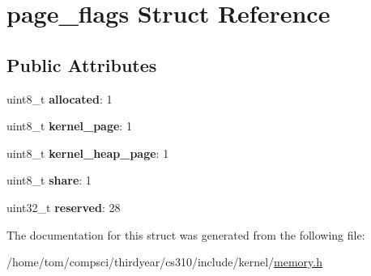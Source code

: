 \hypertarget{structpage__flags}{}\section{page\+\_\+flags Struct Reference}
\label{structpage__flags}
\subsection*{Public Attributes}
\begin{DoxyCompactItemize}
\item 
\mbox{\label{structpage__flags_ae7444465517cea45d08af9cb572ac2a4}} 
uint8\+\_\+t {\bfseries allocated}\+: 1
\item 
\mbox{\label{structpage__flags_a29918bee0403900b950c52369e589a69}} 
uint8\+\_\+t {\bfseries kernel\+\_\+page}\+: 1
\item 
\mbox{\label{structpage__flags_a458f27275121033aa8c285ee0550f99a}} 
uint8\+\_\+t {\bfseries kernel\+\_\+heap\+\_\+page}\+: 1
\item 
\mbox{\label{structpage__flags_aadee98adcf094cbf8f27eb93978c50dc}} 
uint8\+\_\+t {\bfseries share}\+: 1
\item 
\mbox{\label{structpage__flags_a9049c1089b445ffdbb67d6a6ca01ee16}} 
uint32\+\_\+t {\bfseries reserved}\+: 28
\end{DoxyCompactItemize}


The documentation for this struct was generated from the following file\+:\begin{DoxyCompactItemize}
\item 
/home/tom/compsci/thirdyear/cs310/include/kernel/\mbox{\hyperlink{memory_8h}{memory.\+h}}\end{DoxyCompactItemize}
